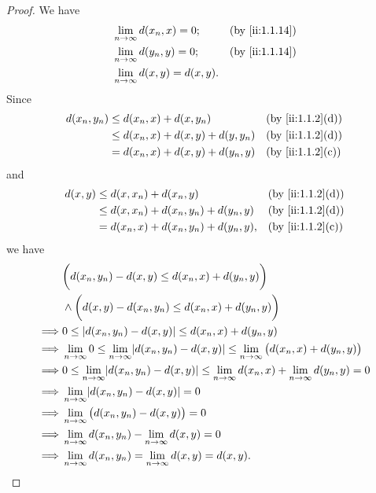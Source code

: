 \begin{proof}
  We have
  \begin{align*}
     & \lim_{n \to \infty} d(x_n, x) = 0;       &  & \by{ii:1.1.14} \\
     & \lim_{n \to \infty} d(y_n, y) = 0;       &  & \by{ii:1.1.14} \\
     & \lim_{n \to \infty} d(x, y)   = d(x, y).
  \end{align*}
  Since
  \begin{align*}
    d(x_n, y_n) & \leq d(x_n, x) + d(x, y_n)           &  & \by{ii:1.1.2}[d] \\
                & \leq d(x_n, x) + d(x, y) + d(y, y_n) &  & \by{ii:1.1.2}[d] \\
                & = d(x_n, x) + d(x, y) + d(y_n, y)    &  & \by{ii:1.1.2}[c]
  \end{align*}
  and
  \begin{align*}
    d(x, y) & \leq d(x, x_n) + d(x_n, y)               &  & \by{ii:1.1.2}[d] \\
            & \leq d(x, x_n) + d(x_n, y_n) + d(y_n, y) &  & \by{ii:1.1.2}[d] \\
            & = d(x_n, x) + d(x_n, y_n) + d(y_n, y),   &  & \by{ii:1.1.2}[c]
  \end{align*}
  we have
  \begin{align*}
             & \bigg(d(x_n, y_n) - d(x, y) \leq d(x_n, x) + d(y_n, y)\bigg)                                                                        \\
             & \land \bigg(d(x, y) - d(x_n, y_n) \leq d(x_n, x) + d(y_n, y)\bigg)                                                                  \\
    \implies & 0 \leq \abs{d(x_n, y_n) - d(x, y)} \leq d(x_n, x) + d(y_n, y)                                                                       \\
    \implies & \lim_{n \to \infty} 0 \leq \lim_{n \to \infty} \abs{d(x_n, y_n) - d(x, y)} \leq \lim_{n \to \infty} \big(d(x_n, x) + d(y_n, y)\big) \\
    \implies & 0 \leq \lim_{n \to \infty} \abs{d(x_n, y_n) - d(x, y)} \leq \lim_{n \to \infty} d(x_n, x) + \lim_{n \to \infty} d(y_n, y) = 0       \\
    \implies & \lim_{n \to \infty} \abs{d(x_n, y_n) - d(x, y)} = 0                                                                                 \\
    \implies & \lim_{n \to \infty} \big(d(x_n, y_n) - d(x, y)\big) = 0                                                                             \\
    \implies & \lim_{n \to \infty} d(x_n, y_n) - \lim_{n \to \infty} d(x, y) = 0                                                                   \\
    \implies & \lim_{n \to \infty} d(x_n, y_n) = \lim_{n \to \infty} d(x, y) = d(x, y).
  \end{align*}
\end{proof}
